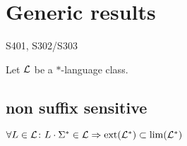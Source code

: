 \section{Generic results}

S401, S302/S303

Let $\mathcal{L}$ be a $*$-language class.

\subsection{non suffix sensitive}
\label{gen:non-suffix-sens}

$\forall L \in \mathcal{L} \colon L \cdot \Sigma^* \in \mathcal{L}
\Rightarrow \operatorname{ext}(\mathcal{L}^*) \subset \lim(\mathcal{L}^*)$
